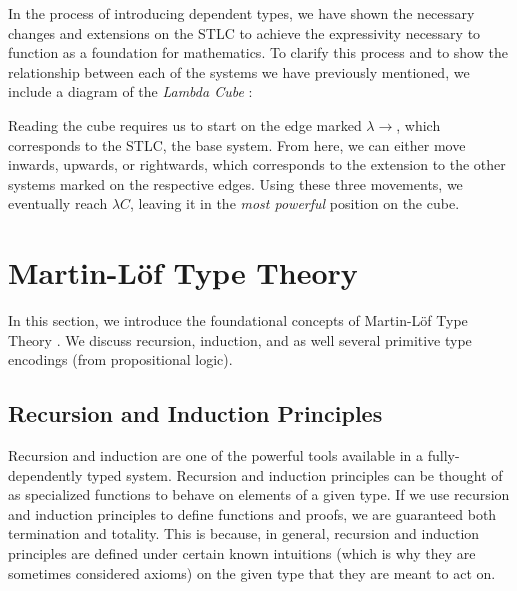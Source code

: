 \documentclass[12pt]{article}
\begin{document}
In the process of introducing dependent types, we have shown the necessary
changes and extensions on the STLC to achieve the expressivity necessary to
function as a foundation for mathematics. To clarify this process and to show
the relationship between each of the systems we have previously mentioned, we
include a diagram of the {\em Lambda Cube} \cite{}:
\begin{center}
\end{center}
Reading the cube requires us to start on the edge marked \(\lambda\!\!\rightarrow\),
which corresponds to the STLC, the base system. From here, we can either move
inwards, upwards, or rightwards, which corresponds to the extension to the other
systems marked on the respective edges. Using these three movements, we
eventually reach \(\lambda C\), leaving it in the {\em most powerful} position
on the cube.

\section{Martin-L\"of Type Theory}
In this section, we introduce the foundational concepts of Martin-L\"of Type
Theory \cite{}. We discuss recursion, induction, and as well several primitive type
encodings (from propositional logic).

\subsection*{Recursion and Induction Principles}
Recursion and induction are one of the powerful tools available in a
fully-dependently typed system. Recursion and induction principles can be
thought of as specialized functions to behave on elements of a given type.
If we use recursion and induction principles to define functions and proofs,
we are guaranteed both termination and totality. This is because, in general,
recursion and induction principles are defined under certain known intuitions
(which is why they are sometimes considered axioms) on the given type that
they are meant to act on.
\end{document}
